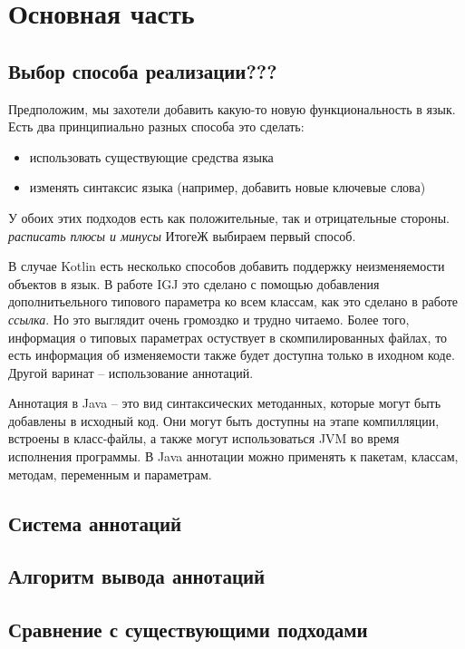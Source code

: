 \chapter{Основная часть}

\section{Выбор способа реализации???}

Предположим, мы захотели добавить какую-то новую функциональность в язык. Есть два принципиально разных способа это сделать:
\begin{itemize}
	\item использовать существующие средства языка
	\item изменять синтаксис языка (например, добавить новые ключевые слова)
\end{itemize}

У обоих этих подходов есть как положительные, так и отрицательные стороны. \textit{расписать плюсы и минусы} ИтогеЖ выбираем первый способ. 

В случае Kotlin есть несколько способов добавить поддержку неизменяемости объектов в язык. В работе IGJ это сделано с помощью добавления дополнитьельного типового параметра ко всем классам, как это сделано в работе \textit{ссылка}. Но это выглядит очень громоздко и трудно читаемо. Более того, информация о типовых параметрах остуствует в скомпилированных файлах, то есть информация об изменяемости также будет доступна только в иходном коде. Другой варинат -- использование аннотаций. 

Аннотация в Java -- это вид синтаксических методанных, которые могут быть добавлены в исходный код. Они могут быть доступны на этапе компилляции, встроены в класс-файлы, а также могут использоваться JVM во время исполнения программы. В Java аннотации можно применять к пакетам, классам, методам, переменным и параметрам. 

\section{Система аннотаций}

\section{Алгоритм вывода аннотаций}

\section{Сравнение с существующими подходами}



